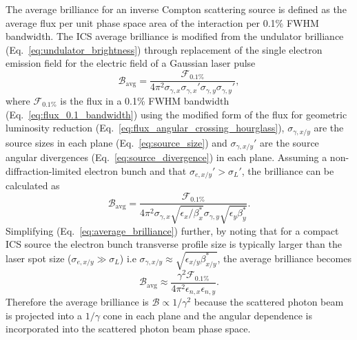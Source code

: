 \documentclass[../main.tex]{subfiles}
\begin{document}
The average brilliance for an inverse Compton scattering source is defined as the average flux per unit phase space area of the interaction per 0.1\% FWHM bandwidth. The ICS average brilliance is modified from the undulator brilliance (Eq.~\ref{eq:undulator_brightness}) through replacement of the single electron emission field for the electric field of a Gaussian laser pulse \cite{krafft2010compton,deitrick2018high}
\begin{equation}
\mathcal{B}_{\mathrm{avg}} = \frac{\mathcal{F}_{0.1\%}}{4\pi^{2}\sigma_{\gamma,x}\sigma_{\gamma,x}'\sigma_{\gamma,y}\sigma_{\gamma,y}'},
\label{eq:average_brilliance}
\end{equation}
where $\mathcal{F}_{0.1\%}$ is the flux in a 0.1\% FWHM bandwidth (Eq.~\ref{eq:flux_0.1_bandwidth}) using the modified form of the flux for geometric luminosity reduction (Eq.~\ref{eq:flux_angular_crossing_hourglass}), $\sigma_{\gamma,x/y}$ are the source sizes in each plane (Eq.~\ref{eq:source_size}) and $\sigma_{\gamma,x/y}'$ are the source angular divergences (Eq.~\ref{eq:source_divergence}) in each plane. Assuming a non-diffraction-limited electron bunch and that $\sigma_{e,x/y}' > \sigma_{L}'$, the brilliance can be calculated as
\begin{equation}
\mathcal{B}_{\mathrm{avg}} = \frac{\mathcal{F}_{0.1\%}}{4\pi^{2}\sigma_{\gamma,x}\sqrt{\epsilon_{x}/\beta_{x}^{*}}\sigma_{\gamma,y}\sqrt{\epsilon_{y}\beta_{y}^{*}}}.
\label{eq:average_brilliance_nondiffraction}    
\end{equation}
Simplifying (Eq.~\ref{eq:average_brilliance}) further, by noting that for a compact ICS source the electron bunch transverse profile size is typically larger than the laser spot size ($\sigma_{e,x/y}\gg\sigma_{L}$) i.e $\sigma_{\gamma,x/y} \approx \sqrt{\epsilon_{x/y}\beta_{x/y}^{*}}$, the average brilliance becomes
\begin{equation}
\mathcal{B}_{\mathrm{avg}} \approx \frac{\gamma^{2}\mathcal{F}_{0.1\%}}{4\pi^{2}\epsilon_{n,x}\epsilon_{n,y}}.
\label{eq:average_brilliance_compact}    
\end{equation}
Therefore the average brilliance is $\mathcal{B}\propto 1/\gamma^{2}$ because the scattered photon beam is projected into a $1/\gamma$ cone in each plane and the angular dependence is incorporated into the scattered photon beam phase space.   
\end{document}
